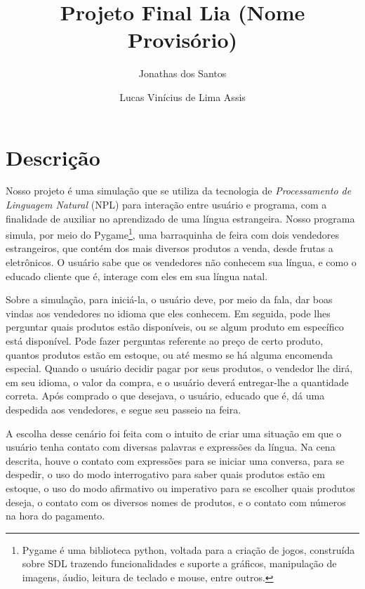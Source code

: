 \documentclass{article}
\title{Projeto Final Lia (Nome Provisório)}
\author{Jonathas dos Santos \and Lucas Vinícius de Lima Assis}
\begin{document}
    \maketitle
    
    \section{Descrição}
        Nosso projeto é uma simulação que se utiliza da tecnologia de
        \emph{Processamento de Linguagem Natural} (NPL) para interação entre
        usuário e programa, com a finalidade de auxiliar no aprendizado de uma
        língua estrangeira. Nosso programa simula, por meio do
        Pygame\footnote{Pygame é uma biblioteca python, voltada para a criação
        de jogos, construída sobre SDL trazendo funcionalidades e suporte a
        gráficos, manipulação de imagens, áudio, leitura de teclado e mouse,
        entre outros.}, uma barraquinha de feira com dois vendedores
        estrangeiros, que contém dos mais diversos produtos a venda, desde
        frutas a eletrônicos. O usuário sabe que os vendedores não conhecem sua
        língua, e como o educado cliente que é, interage com eles em sua língua
        natal. 

        Sobre a simulação, para iniciá-la, o usuário deve, por meio da fala, dar
        boas vindas aos vendedores no idioma que eles conhecem. Em seguida,
        pode lhes perguntar quais produtos estão disponíveis, ou se algum
        produto em específico está disponível. Pode fazer perguntas referente ao
        preço de certo produto, quantos produtos estão em estoque, ou até mesmo
        se há alguma encomenda especial. Quando o usuário decidir pagar por seus
        produtos, o vendedor lhe dirá, em seu idioma, o valor da compra, e o
        usuário deverá entregar-lhe a quantidade correta. Após comprado o que
        desejava, o usuário, educado que é, dá uma despedida aos vendedores, e
        segue seu passeio na feira.

        A escolha desse cenário foi feita com o intuito de criar uma situação em que o
        usuário tenha contato com diversas palavras e expressões da língua. Na
        cena descrita, houve o contato com expressões para se iniciar uma
        conversa, para se despedir, o uso do modo interrogativo para saber quais
        produtos estão em estoque, o uso do modo afirmativo ou imperativo para
        se escolher quais produtos deseja, o contato com os diversos nomes de
        produtos, e o contato com números na hora do pagamento. 
\end{document}
